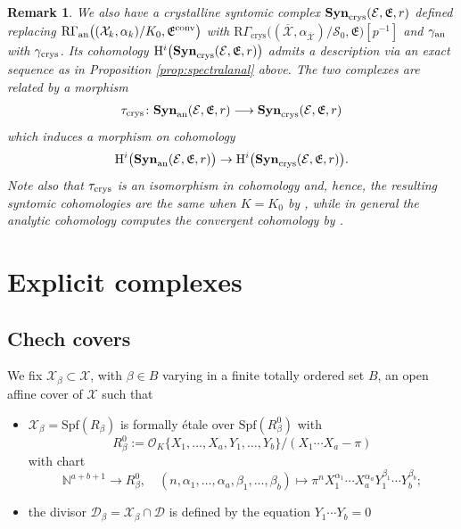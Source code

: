 \documentclass[asterisque,english]{smfart}
\newtheorem{remark}[theo]{Remark}
\begin{document}
\begin{remark}\label{rmk:crysanal}  We also have a crystalline syntomic complex $\mathbf{Syn}_{\rm crys}(\mathcal{E},\mathfrak{E},r)$ defined replacing $\mathrm{R}\Gamma_{\mathrm{an}}\bigl((\mathcal{X}_k,\alpha_k)/K_0,\mathfrak{E}^{\rm conv}\bigr)$ with  $\mathrm{R}\Gamma_{\mathrm{crys}}\bigl((\overline{\mathcal{X}},\alpha_{\overline{\mathcal{X}}})/\mathcal{S}_0,\mathfrak{E}\bigr) [p^{-1}]$ and $\gamma_{\rm an}$ with $\gamma_{\rm crys}$. Its cohomology $\mathrm{H}^i\bigl(\mathbf{Syn}_{\rm crys}(\mathcal{E},\mathfrak{E},r)\bigr)$ admits a description via an exact sequence as in Proposition \ref{prop:spectralanal} above.  The two complexes are related by a morphism $$\tau_{\rm crys}\colon\mathbf{Syn}_{\rm an}(\mathcal{E},\mathfrak{E},r)\longrightarrow \mathbf{Syn}_{\rm crys}(\mathcal{E},\mathfrak{E},r) $$which induces a morphism on cohomology $$\mathrm{H}^i\bigl(\mathbf{Syn}_{\rm an}(\mathcal{E},\mathfrak{E},r)\bigr) \to \mathrm{H}^i\bigl(\mathbf{Syn}_{\rm crys}(\mathcal{E},\mathfrak{E},r)\bigr). $$
Note also that $\tau_{\rm crys}$ is an isomorphism in cohomology and, hence, the resulting syntomic cohomologies are the same when $K=K_0$ by \cite[Thm.~3.1.1]{Shiho}, while in general the analytic cohomology computes the convergent cohomology by \cite[Thm.~2.3.9]{Shiho}.

\end{remark}


\section{Explicit complexes}



\subsection{Chech covers}\label{sec:Chech}

We fix $\mathcal{X}_\beta\subset \mathcal{X}$, with $\beta\in B$ varying in a  finite totally ordered set $B$, an open affine cover of $\mathcal{X}$ such that 

\begin{itemize}


\item[i.] $\mathcal{X}_\beta=\mathrm{Spf}(R_\beta)$ is formally \'etale over  $\mathrm{Spf}(R_\beta^0)$ with $$R_\beta^0:=\mathcal{O}_{K}\{X_1,\ldots,X_a,Y_1,\ldots,Y_b\}/(X_1\cdots X_a-\pi) $$with chart $$\mathbb{N}^{a+b+1}  \to R_\beta^0,\quad (n,\alpha_1,\ldots,\alpha_a,\beta_1,\ldots,\beta_b)\mapsto \pi^n X_1^{\alpha_1}\cdots X_a^{\alpha_a}Y_1^{\beta_1}\cdots Y_b^{\beta_b};$$

\item[ii.] the divisor $\mathcal{D}_\beta=\mathcal{X}_\beta\cap \mathcal{D}$ is defined  by the equation $Y_1\cdots Y_b=0$

\end{itemize}
\end{document}
